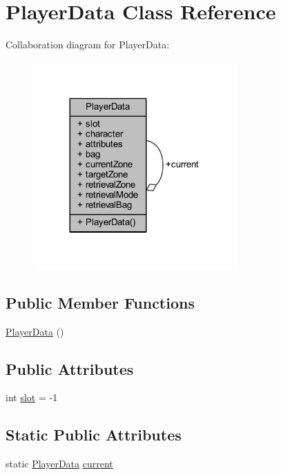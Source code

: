 \hypertarget{class_player_data}{}\section{Player\+Data Class Reference}
\label{class_player_data}


Collaboration diagram for Player\+Data\+:
\nopagebreak
\begin{figure}[H]
\begin{center}
\leavevmode
\includegraphics[width=221pt]{class_player_data__coll__graph}
\end{center}
\end{figure}
\subsection*{Public Member Functions}
\begin{DoxyCompactItemize}
\item 
\mbox{\hyperlink{class_player_data_a7dc81cafeb02f4843f6c6ec738323ad9}{Player\+Data}} ()
\end{DoxyCompactItemize}
\subsection*{Public Attributes}
\begin{DoxyCompactItemize}
\item 
int \mbox{\hyperlink{class_player_data_ad3b89e484ba4ff9a3dcc3a477af1453a}{slot}} = -\/1
\end{DoxyCompactItemize}
\subsection*{Static Public Attributes}
\begin{DoxyCompactItemize}
\item 
static \mbox{\hyperlink{class_player_data}{Player\+Data}} \mbox{\hyperlink{class_player_data_a56e50eb15fe325645f0a7206a53f3956}{current}}
\end{DoxyCompactItemize}
